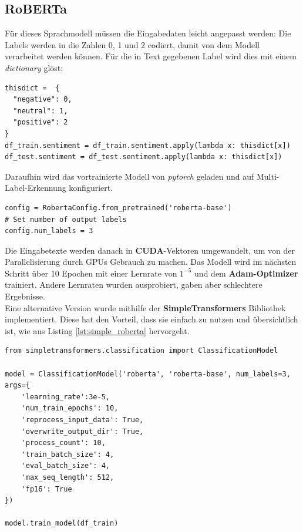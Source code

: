 \subsection{RoBERTa}
F\"ur dieses Sprachmodell m\"ussen die Eingabedaten leicht angepasst werden: Die Labels werden in die Zahlen 0, 1 und 2 codiert, damit von dem Modell verarbeitet werden k\"onnen. F\"ur die in Text gegebenen Label wird dies mit einem \textit{dictionary} gl\"ost:
\lstset{language=Python}
\lstset{frame=lines}
\lstset{captionpos=b}
\lstset{basicstyle=\footnotesize}
\begin{lstlisting}
thisdict =	{
  "negative": 0,
  "neutral": 1,
  "positive": 2
}
df_train.sentiment = df_train.sentiment.apply(lambda x: thisdict[x])
df_test.sentiment = df_test.sentiment.apply(lambda x: thisdict[x])
\end{lstlisting}
Daraufhin wird das vortrainierte Modell von \textit{pytorch} geladen und auf Multi-Label-Erkennung konfiguriert.
\lstset{language=Python}
\lstset{frame=lines}
\lstset{captionpos=b}
\lstset{basicstyle=\footnotesize}
\begin{lstlisting}
config = RobertaConfig.from_pretrained('roberta-base')
# Set number of output labels
config.num_labels = 3
\end{lstlisting}
Die Eingabetexte werden danach in \textbf{CUDA}-Vektoren umgewandelt, um von der Parallelisierung durch GPUs Gebrauch zu machen. Das Modell wird im n\"achsten Schritt \"uber 10 Epochen mit einer Lernrate von $1^{-5}$ und dem \textbf{Adam-Optimizer} trainiert. Andere Lernraten wurden ausprobiert, gaben aber schlechtere Ergebnisse.\\
Eine alternative Version wurde mithilfe der \textbf{SimpleTransformers} Bibliothek implementiert. Diese hat den Vorteil, dass sie einfach zu nutzen und \"ubersichtlich ist, wie aus Listing \ref{lst:simple_roberta} hervorgeht.
\lstset{language=Python}
\lstset{frame=lines}
\lstset{captionpos=b}
\lstset{basicstyle=\footnotesize}
\begin{lstlisting}
from simpletransformers.classification import ClassificationModel

model = ClassificationModel('roberta', 'roberta-base', num_labels=3, args={
    'learning_rate':3e-5,
    'num_train_epochs': 10,
    'reprocess_input_data': True,
    'overwrite_output_dir': True,
    'process_count': 10,
    'train_batch_size': 4,
    'eval_batch_size': 4,
    'max_seq_length': 512,
    'fp16': True
})

model.train_model(df_train)
\end{lstlisting}

